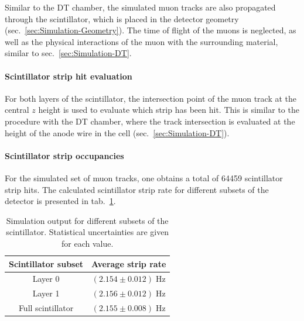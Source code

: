 Similar to the \ac{DT} chamber, the simulated muon tracks are also propagated through the scintillator, which is placed in the detector geometry (sec.\ \ref{sec:Simulation-Geometry}). The time of flight of the muons is neglected, as well as the physical interactions of the muon with the surrounding material, similar to sec.\ \ref{sec:Simulation-DT}.
\FloatBarrier
\paragraph{Scintillator strip hit evaluation}
For both layers of the scintillator, the intersection point of the muon track at the central $z$ height is used to evaluate which strip has been hit. This is similar to the procedure with the \ac{DT} chamber, where the track intersection is evaluated at the height of the anode wire in the cell (sec.\ \ref{sec:Simulation-DT}).
\FloatBarrier
\paragraph{Scintillator strip occupancies}
For the simulated set of muon tracks, one obtains a total of \num{64459} scintillator strip hits. The calculated scintillator strip rate for different subsets of the detector is presented in tab.\ \ref{tab:Simulation-StripRates}.
\begin{table}[htb]
\centering
\begin{tabular}{|c|c|}  %
\hline
Scintillator subset & Average strip rate \\ \hline
Layer 0 & $(2.154\pm 0.012)\;\si{\hertz}$ \\
Layer 1 & $(2.156 \pm 0.012)\;\si{\hertz}$ \\
Full scintillator & $(2.155 \pm 0.008)\;\si{\hertz}$ \\ \hline
\end{tabular}
\caption{Simulation output for different subsets of the scintillator. Statistical uncertainties are given for each value.}
\label{tab:Simulation-StripRates}
\end{table}

